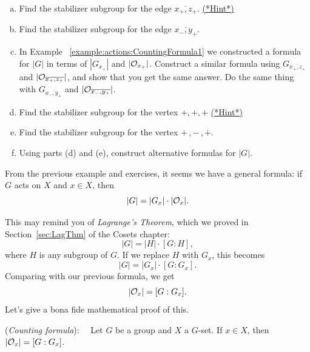\begin{exercise}\label{exercise:actions:CountingFormula2}
\begin{enumerate}[(a)]
\item Find the stabilizer subgroup for the edge $\overline{x_+,z_+}$. 
\hyperref[sec:actions:hints]{(*Hint*)}
\item Find the stabilizer subgroup for the edge $\overline{x_-,y_+}$.
\item In Example ~\ref{example:actions:CountingFormula1} we constructed a formula for $|G|$ in terms of $| G_{x_+}|$ and $|{\cal O}_{x_+}|$.  Construct a similar formula using $G_{\overline{x_+,z_+}}$ and $|{\cal O}_{\overline{x_+,z_+}}|$, and show that you get the same answer. Do the same thing with $G_{\overline{x_-,y_+}}$ and $|{\cal O}_{\overline{x_-,y_+}}|$.  
\item Find the stabilizer subgroup for the vertex $+,+,+$ 
\hyperref[sec:actions:hints]{(*Hint*)}
\item Find the stabilizer subgroup for the vertex $+\,,-\,,+$. 
\item Using parts (d) and (e), construct alternative formulas for $|G|$.
\end{enumerate}
\end{exercise}

From the previous example and exercises, it seems we have a general formula:  if $G$ acts on $X$ and $x\in X$, then 
$$|G|=|G_x|\cdot|{\cal O}_x|.$$

This may remind you of \emph{Lagrange's Theorem}, which we proved in Section~\ref{sec:LagThm} of the Cosets chapter:  
$$|G|=|H|\cdot [G:H], $$
where $H$ is any subgroup of $G$.  If we replace $H$ with $G_x$, this becomes $$|G|=|G_x|\cdot [G:G_x]. $$
Comparing with our previous formula, we get
 $$|{\cal O}_x|=[G:G_x].$$
Let's give a bona fide mathematical proof of this.

\begin{prop}\label{proposition:actions:CountingFormula}(\emph{Counting formula}):~~
Let $G$ be a group and $X$ a $G$-set. If $x\in X$,
then $|{\cal O}_x| = [G:G_x]$. 
\end{prop}


